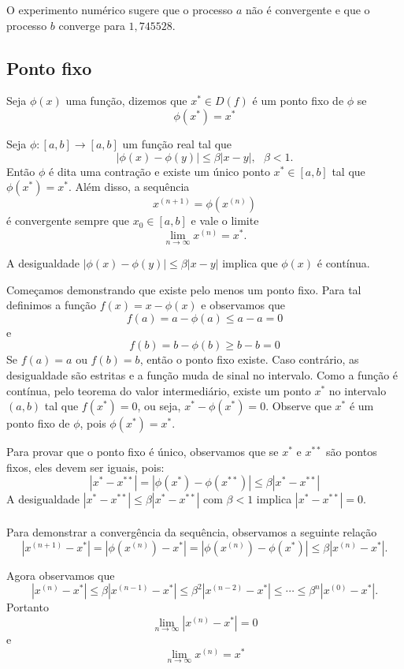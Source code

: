 O experimento numérico sugere que o processo $a$ não é convergente e que o processo $b$ converge para $1,745528$.

\subsection{Ponto fixo}

Seja $\phi (x)$ uma função, dizemos que $x^*\in D(f)$ é um ponto fixo de $\phi$ se
$$\phi(x^*)=x^*$$

Seja $\phi:[a,b]\to [a,b]$ um função real tal que
$$|\phi(x)-\phi(y)|\leq \beta |x-y|,~~~\beta<1.$$
Então $\phi$ é dita uma contração e existe um único ponto $x^*\in [a,b]$ tal que $\phi(x^*)=x^*$. Além disso, a sequência
$$x^{(n+1)}=\phi(x^{(n)})$$
é convergente sempre que $x_0\in[a,b]$ e vale o limite $$\lim_{n\to\infty}x^{(n)}=x^*.$$

\begin{obs}
A desigualdade $|\phi(x)-\phi(y)|\leq \beta |x-y|$ implica que $\phi(x)$ é contínua.  
\end{obs}

Começamos demonstrando que existe pelo menos um ponto fixo. Para tal definimos a função $f(x)=x-\phi(x)$ e observamos que
$$f(a)=a-\phi(a)\leq a-a=0$$
e
$$f(b)=b-\phi(b)\geq b-b=0$$
Se $f(a)=a$ ou $f(b)=b$, então o ponto fixo existe. Caso contrário, as desigualdade são estritas e a função muda de sinal no intervalo. Como a função é contínua, pelo teorema do valor intermediário, existe um ponto $x^*$ no intervalo $(a,b)$ tal que $f(x^*)=0$, ou seja, $x^*-\phi(x^*)=0$. Observe que $x^*$ é um ponto fixo de $\phi$, pois $\phi(x^*)=x^*$. 

Para provar que o ponto fixo é único, observamos que se $x^*$ e $x^{**}$ são pontos fixos, eles devem ser iguais, pois:
$$|x^*-x^{**}|=|\phi(x^{*})-\phi(x^{**})|\leq \beta |x^*-x^{**}|$$
A desigualdade $|x^*-x^{**}|\leq \beta |x^*-x^{**}|$ com $\beta<1$ implica $|x^*-x^{**}|=0$.
\\~\\

Para demonstrar a convergência da sequência, observamos a seguinte relação
$$|x^{(n+1)}-x^*|=|\phi(x^{(n)})-x^*|=|\phi(x^{(n)})-\phi(x^*)|\leq \beta |x^{(n)}-x^*|.$$

Agora observamos que
$$|x^{(n)}-x^*|\leq  \beta |x^{(n-1)}-x^*|\leq \beta^2 |x^{(n-2)}-x^*|\leq \cdots \leq \beta^{n}|x^{(0)}-x^*|.$$
Portanto
$$\lim_{n\to\infty}|x^{(n)}-x^*|=0$$
e
$$\lim_{n\to\infty}x^{(n)}=x^*$$

